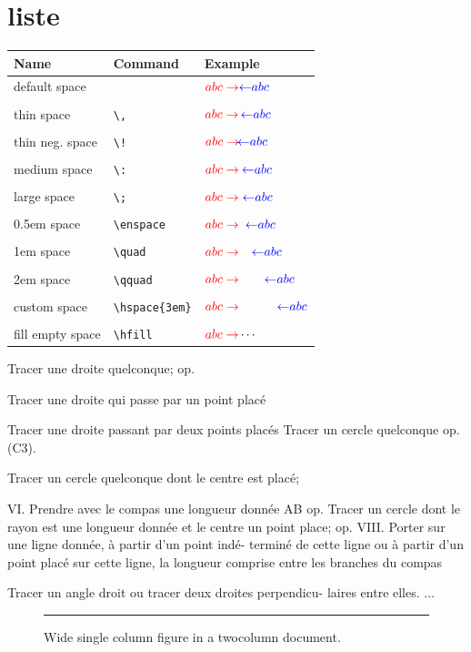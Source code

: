 \documentclass[12pt,a4paper,twocolumn]{book} %
\newcommand\rlArrow[1]{$\color{red}{abc \rightarrow} #1 \color{blue}{\leftarrow} abc$\\}
\begin{document}
\section{liste}
\begin{tabular}{lll}
    \hline
    Name & Command & Example\\
    \hline
    default space & & \rlArrow{}\\
    thin space & \verb|\,| & \rlArrow{\,}\\
    thin neg. space & \verb|\!| & \rlArrow{\!}\\
    medium space & \verb|\:| & \rlArrow{\:}\\
    large space & \verb|\;| & \rlArrow{\;}\\
    0.5em space & \verb|\enspace| & \rlArrow{\enspace}\\
    1em space & \verb|\quad| & \rlArrow{\quad}\\
    2em space & \verb|\qquad| & \rlArrow{\qquad}\\
    custom space & \verb|\hspace{3em}| & \rlArrow{\hspace{3em}}\\
    fill empty space & \verb|\hfill| & $\color{red}{abc \rightarrow} \color{black}\cdots$\\
    \hline
\end{tabular}
\begin{turn}{45}
  \begin{minipage}{\linewidth}
    Tracer une droite quelconque; op.

Tracer une droite qui passe par un point placé

Tracer une droite passant par deux points placés
Tracer un cercle quelconque op. (C3).

Tracer un cercle quelconque dont le centre est placé;

VI. Prendre avec le compas une longueur donnée AB
op.
Tracer un cercle dont le rayon est une longueur donnée
et le centre un point place; op.
VIII. Porter sur une ligne donnée, à partir d'un point indé-
terminé de cette ligne ou à partir d'un point placé
sur cette ligne, la longueur comprise entre les branches du compas

Tracer un angle droit ou tracer deux droites perpendicu-
laires entre elles.
...

  \end{minipage}

\end{turn}
\begin{figure}[ht]
\centering
\rule{\linewidth}{3cm}
\caption{Wide single column figure in a twocolumn document.}
\end{figure}
\end{document}
